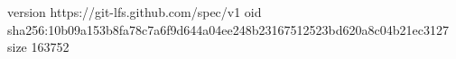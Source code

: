 version https://git-lfs.github.com/spec/v1
oid sha256:10b09a153b8fa78c7a6f9d644a04ee248b23167512523bd620a8c04b21ec3127
size 163752
